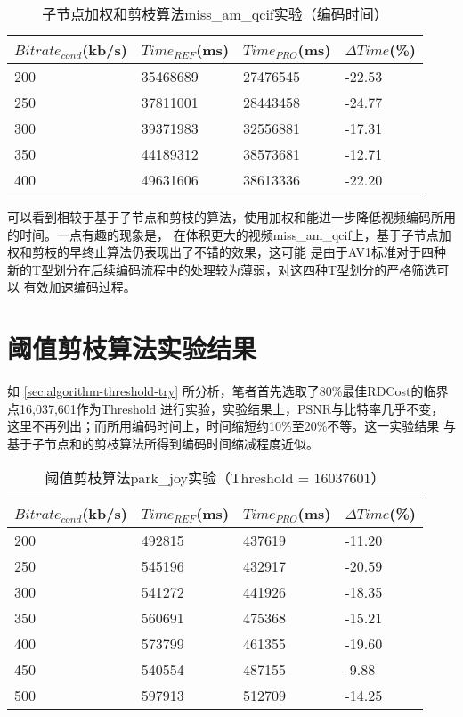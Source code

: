 \begin{table}[H]
  \centering
    \caption{子节点加权和剪枝算法miss\_am\_qcif实验（编码时间）}
    \label{tab:result-weighted-miss-time}
    \begin{tabularx}{\linewidth}{XXXX}
      \toprule[1.5pt]
      $Bitrate_{cond}$(kb/s) & $Time_{REF}$(ms) & $Time_{PRO}$(ms) & $\Delta Time$(\%) \\
      \midrule[1pt]
      200 & 35468689 & 27476545 & -22.53 \\
      250 & 37811001 & 28443458 & -24.77 \\
      300 & 39371983 & 32556881 & -17.31 \\
      350 & 44189312 & 38573681 & -12.71\\
      400 & 49631606 & 38613336 & -22.20\\
      \bottomrule[1.5pt]
    \end{tabularx}
\end{table}


可以看到相较于基于子节点和剪枝的算法，使用加权和能进一步降低视频编码所用的时间。一点有趣的现象是，
在体积更大的视频miss\_am\_qcif上，基于子节点加权和剪枝的早终止算法仍表现出了不错的效果，这可能
是由于AV1标准对于四种新的T型划分在后续编码流程中的处理较为薄弱，对这四种T型划分的严格筛选可以
有效加速编码过程。


\section{阈值剪枝算法实验结果}

如 \ref{sec:algorithm-threshold-try} 所分析，笔者首先选取了80\%最佳RDCost的临界点16,037,601作为Threshold
进行实验，实验结果上，PSNR与比特率几乎不变，这里不再列出；而所用编码时间上，时间缩短约10\%至20\%不等。这一实验结果
与基于子节点和的剪枝算法所得到编码时间缩减程度近似。

\begin{table}[H]
  \centering
    \caption{阈值剪枝算法park\_joy实验（Threshold = 16037601）}
    \label{tab:result-threshold-park-time}
    \begin{tabularx}{\linewidth}{XXXX}
      \toprule[1.5pt]
      $Bitrate_{cond}$(kb/s) & $Time_{REF}$(ms) & $Time_{PRO}$(ms) & $\Delta Time$(\%) \\
      \midrule[1pt]
      200 & 492815 & 437619 & -11.20  \\
      250 & 545196 & 432917 & -20.59 \\
      300 & 541272 & 441926 & -18.35  \\
      350 & 560691 & 475368 & -15.21 \\
      400 & 573799 & 461355 & -19.60  \\
      450 & 540554 & 487155 & -9.88 \\
      500 & 597913 & 512709 & -14.25  \\
      \bottomrule[1.5pt]
    \end{tabularx}
\end{table}


